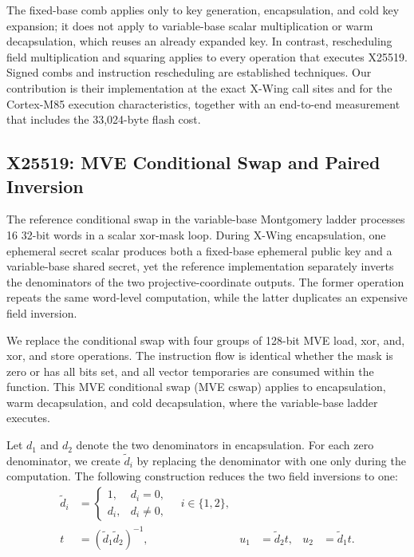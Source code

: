 \documentclass[runningheads,orivec]{llncs}
\newcommand{\xwing}{X-Wing}
\begin{document}
The fixed-base comb applies only to key generation, encapsulation, and cold key
expansion; it does not apply to variable-base scalar multiplication or warm
decapsulation, which reuses an already expanded key. In contrast, rescheduling
field multiplication and squaring applies to every operation that executes
X25519. Signed combs and instruction rescheduling are established techniques.
Our contribution is their implementation at the exact \xwing{} call sites and
for the Cortex-M85 execution characteristics, together with an end-to-end
measurement that includes the 33,024-byte flash cost.

\subsection{X25519: MVE Conditional Swap and Paired Inversion}

The reference conditional swap in the variable-base Montgomery ladder processes
16 32-bit words in a scalar xor-mask loop. During \xwing{} encapsulation, one
ephemeral secret scalar produces both a fixed-base ephemeral public key and a
variable-base shared secret, yet the reference implementation separately
inverts the denominators of the two projective-coordinate outputs. The former
operation repeats the same word-level computation, while the latter duplicates
an expensive field inversion.

We replace the conditional swap with four groups of 128-bit MVE load, xor, and,
xor, and store operations. The instruction flow is identical whether the mask
is zero or has all bits set, and all vector temporaries are consumed within the
function. This MVE conditional swap (MVE cswap) applies to encapsulation, warm
decapsulation, and cold decapsulation, where the variable-base ladder executes.

Let $d_1$ and $d_2$ denote the two denominators in encapsulation. For each zero
denominator, we create $\widetilde d_i$ by replacing the denominator with one
only during the computation. The following construction reduces the two field
inversions to one:
\begin{equation}
\begin{aligned}
\widetilde d_i & =
\begin{cases}
1, & d_i=0,\\
d_i, & d_i\neq0,
\end{cases}
\quad i\in\{1,2\},\\
t & = (\widetilde d_1\widetilde d_2)^{-1}, &
u_1 & = \widetilde d_2t, &
u_2 & = \widetilde d_1t .
\end{aligned}
\label{eq:paired-inversion}
\end{equation}
\end{document}
